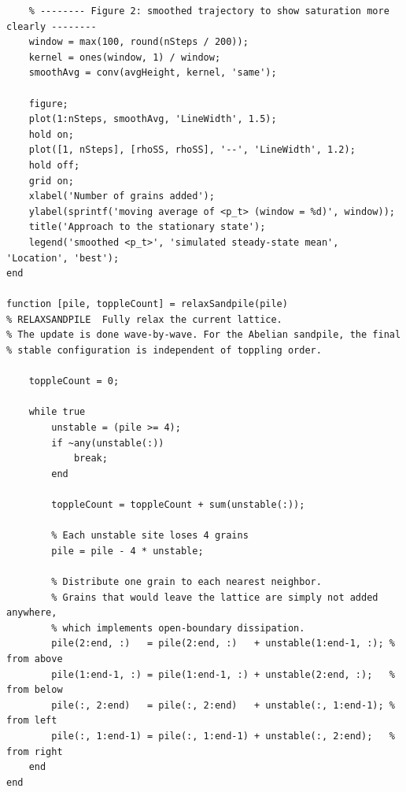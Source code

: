 \documentclass{article}
\begin{document}
\begin{lstlisting}
    % -------- Figure 2: smoothed trajectory to show saturation more clearly --------
    window = max(100, round(nSteps / 200));
    kernel = ones(window, 1) / window;
    smoothAvg = conv(avgHeight, kernel, 'same');

    figure;
    plot(1:nSteps, smoothAvg, 'LineWidth', 1.5);
    hold on;
    plot([1, nSteps], [rhoSS, rhoSS], '--', 'LineWidth', 1.2);
    hold off;
    grid on;
    xlabel('Number of grains added');
    ylabel(sprintf('moving average of <p_t> (window = %d)', window));
    title('Approach to the stationary state');
    legend('smoothed <p_t>', 'simulated steady-state mean', 'Location', 'best');
end

function [pile, toppleCount] = relaxSandpile(pile)
% RELAXSANDPILE  Fully relax the current lattice.
% The update is done wave-by-wave. For the Abelian sandpile, the final
% stable configuration is independent of toppling order.

    toppleCount = 0;

    while true
        unstable = (pile >= 4);
        if ~any(unstable(:))
            break;
        end

        toppleCount = toppleCount + sum(unstable(:));

        % Each unstable site loses 4 grains
        pile = pile - 4 * unstable;

        % Distribute one grain to each nearest neighbor.
        % Grains that would leave the lattice are simply not added anywhere,
        % which implements open-boundary dissipation.
        pile(2:end, :)   = pile(2:end, :)   + unstable(1:end-1, :); % from above
        pile(1:end-1, :) = pile(1:end-1, :) + unstable(2:end, :);   % from below
        pile(:, 2:end)   = pile(:, 2:end)   + unstable(:, 1:end-1); % from left
        pile(:, 1:end-1) = pile(:, 1:end-1) + unstable(:, 2:end);   % from right
    end
end
\end{lstlisting}

\clearpage
\end{document}
